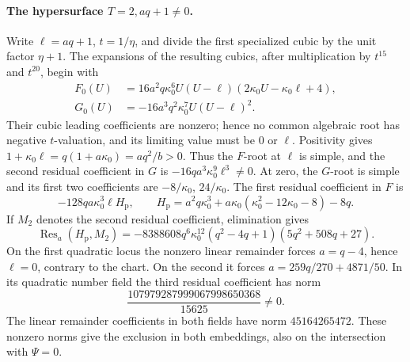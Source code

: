 \documentclass[11pt,a4paper]{article}
\numberwithin{equation}{section}
\theoremstyle{plain}
\theoremstyle{definition}
\theoremstyle{remark}
\begin{document}
\paragraph{The hypersurface \(T=2,aq+1\ne0\).}
Write \(\ell=aq+1\), \(t=1/\eta\), and divide the first specialized
cubic by the unit factor \(\eta+1\). The expansions of the resulting
cubics, after multiplication by \(t^{15}\) and \(t^{20}\), begin with
\[
 \begin{aligned}
 F_0(U)&=16a^2q\kappa_0 ^6U(U-\ell)(2\kappa_0 U-\kappa_0 \ell+4),\\
 G_0(U)&=-16a^3q^2\kappa_0 ^7U(U-\ell)^2.
 \end{aligned}
\]
Their cubic leading coefficients are nonzero; hence no common algebraic
root has negative \(t\)-valuation, and its limiting value must be
\(0\) or \(\ell\).  Positivity gives
\(1+\kappa_0 \ell=q(1+a\kappa_0 )=aq^2/b>0\).  Thus the \(F\)-root at \(\ell\)
is simple, and the second residual coefficient in \(G\) is
\(-16qa^3\kappa_0 ^9\ell^3\ne0\).  At zero, the \(G\)-root is simple and
its first two coefficients are \(-8/\kappa_0 \), \(24/\kappa_0 \).
The first residual coefficient in \(F\) is
\[
 -128qa\kappa_0 ^3\ell H_{\mathrm p},\qquad
 H_{\mathrm p}=a^2q\kappa_0 ^3+a\kappa_0 (\kappa_0 ^2-12\kappa_0 -8)-8q.
\]
If \(M_2\) denotes the second residual coefficient, elimination gives
\[
 \operatorname{Res}_a(H_{\mathrm p},M_2)=
 -8388608q^6\kappa_0 ^{12}(q^2-4q+1)(5q^2+508q+27).
\]
On the first quadratic locus the nonzero linear remainder forces
\(a=q-4\), hence \(\ell=0\), contrary to the chart.  On the second
it forces \(a=259q/270+4871/50\).  In its quadratic number field the
third residual coefficient has norm
\[
 \frac{107979287999067998650368}{15625}\ne0.
\]
The linear remainder coefficients in both fields have norm \(45164265472\).
These nonzero norms give the exclusion in both embeddings, also on the
intersection with \(\Psi=0\).
\end{document}
